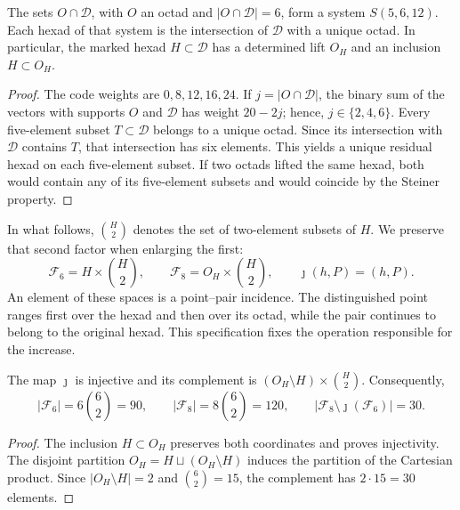 \begin{proposition}
\label{rev4:ae:elevacion}
The sets \(O\cap\mathscr D\), with \(O\) an octad and
\(|O\cap\mathscr D|=6\), form a system \(S(5,6,12)\).
Each hexad of that system is the intersection of \(\mathscr D\) with
a unique octad. In particular, the marked hexad \(H\subset\mathscr D\)
has a determined lift \(O_H\) and an inclusion \(H\subset O_H\).
\end{proposition}
\begin{proof}
The code weights are \(0,8,12,16,24\). If
\(j=|O\cap\mathscr D|\), the binary sum of the vectors with supports
\(O\) and \(\mathscr D\) has weight \(20-2j\); hence,
\(j\in\{2,4,6\}\). Every five-element subset \(T\subset\mathscr D\)
belongs to a unique octad. Since its intersection with \(\mathscr D\)
contains \(T\), that intersection has six elements. This yields
a unique residual hexad on each five-element subset. If two octads lifted
the same hexad, both would contain any of its five-element subsets and
would coincide by the Steiner property.
\end{proof}

In what follows, \(\binom H2\) denotes the set of two-element
subsets of \(H\). We preserve that second factor when enlarging the first:
\begin{equation}
 \mathcal F_6=H\times\binom H2,
 \qquad
 \mathcal F_8=O_H\times\binom H2,
 \qquad
 \jmath(h,P)=(h,P).
 \label{rev4:ae:incidencias}
\end{equation}
An element of these spaces is a point--pair incidence. The distinguished
point ranges first over the hexad and then over its octad, while the
pair continues to belong to the original hexad. This specification
fixes the operation responsible for the increase.

\begin{proposition}
\label{rev4:ae:incremento}
The map \(\jmath\) is injective and its complement is
\((O_H\setminus H)\times\binom H2\). Consequently,
\begin{equation}
 |\mathcal F_6|=6\binom62=90,
 \qquad |\mathcal F_8|=8\binom62=120,
 \qquad |\mathcal F_8\setminus\jmath(\mathcal F_6)|=30.
 \label{rev4:ae:cardinales}
\end{equation}
\end{proposition}
\begin{proof}
The inclusion \(H\subset O_H\) preserves both coordinates and proves
injectivity. The disjoint partition \(O_H=H\sqcup(O_H\setminus H)\)
induces the partition of the Cartesian product. Since
\(|O_H\setminus H|=2\) and \(\binom62=15\), the complement has
\(2\cdot15=30\) elements.
\end{proof}

